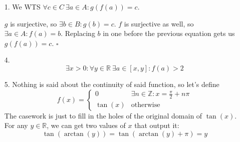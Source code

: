 \documentclass[12pt]{article}
\begin{document}
\begin{enumerate}
      \item[1.] We WTS $\forall c \in C\ \exists a \in A: g(f(a))=c$.

            $g$ is surjective, so $\exists b \in B: g(b)=c$.
            $f$ is surjective as well, so $\exists a \in A: f(a)=b$.
            Replacing $b$ in one before the previous equation gets us $g(f(a))=c$. $\square$
      \item[4.] \[\exists x > 0: \forall y \in \mathbb{R}\ \exists a \in [x, y]: f(a) > 2\]
      \item[5.] Nothing is said about the continuity of said function, so let's define
            \[f(x)=\begin{cases}
                        0       & \exists n \in \mathbb{Z}: x=\frac{\pi}{2}+n\pi \\
                        \tan(x) & \text{otherwise}
                  \end{cases}\]
            The casework is just to fill in the holes of the original domain of $\tan(x)$.
            For any $y \in \mathbb{R}$, we can get two values of $x$ that output it:
            \[\tan(\arctan(y))=\tan(\arctan(y)+\pi)=y\]
\end{enumerate}
\end{document}
